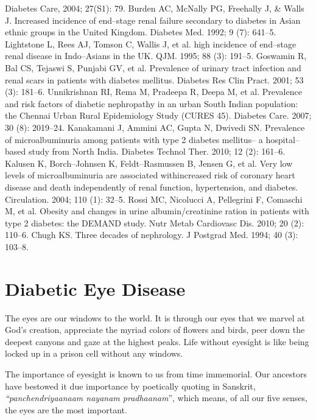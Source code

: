 \begin{thebibliography}{99}
 Diabetes Care, 2004; 27(S1): 79.
 Burden AC, McNally PG, Freehally J, \& Walls J. Increased incidence of end–stage renal failure secondary to diabetes in Asian ethnic groups in the United Kingdom. Diabetes Med. 1992; 9 (7): 641–5.
 Lightstone L, Rees AJ, Tomson C, Wallis J, et al. high incidence of end–stage renal disease in Indo–Asians in the UK. QJM. 1995; 88 (3): 191–5.
 Goswamin R, Bal CS, Tejaswi S, Punjabi GV, et al. Prevalence of urinary tract infection and renal scars in patients with diabetes mellitus. Diabetes Res Clin Pract. 2001; 53 (3): 181–6.
 Unnikrishnan RI, Rema M, Pradeepa R, Deepa M, et al. Prevalence and risk factors of diabetic nephropathy in an urban South Indian population: the Chennai Urban Rural Epidemiology Study (CURES 45). Diabetes Care. 2007; 30 (8): 2019–24.
 Kanakamani J, Ammini AC, Gupta N, Dwivedi SN. Prevalence of microalbuminuria among patients with type 2 diabetes mellitus– a hospital–based study from North India. Diabetes Technol Ther. 2010; 12 (2): 161–6.
 Kalusen K, Borch–Johnsen K, Feldt–Rasmussen B, Jensen G, et al. Very low levels of microalbuminuria are associated with\break increased risk of coronary heart disease and death independently of renal function, hypertension, and diabetes. Circulation. 2004; 110 (1): 32–5.
 Rossi MC, Nicolucci A, Pellegrini F, Comaschi M, et al. Obesity and changes in urine albumin/creatinine ration in patients with type 2 diabetes: the DEMAND study. Nutr Metab Cardiovasc Dis. 2010; 20 (2): 110–6.
 Chugh KS. Three decades of nephrology. J Postgrad Med. 1994; 40 (3): 103–8.
\end{thebibliography}

\renewcommand{\thechapter}{\arabic{chapter}}
\chapter{Diabetic Eye Disease}\label{chap15}

The eyes are our windows to the world. It is through our eyes that we marvel at God’s creation, appreciate the myriad colors of flowers and birds, peer down the deepest canyons and gaze at the highest peaks. Life without eyesight is like being locked up in a prison cell without any windows.

The importance of eyesight is known to us from time immemorial. Our ancestors have bestowed it due importance by poetically quoting in Sanskrit, \textit{“panchendriyaanaam nayanam pradhaanam}”, which means, of all our five senses, the eyes are the most important.

